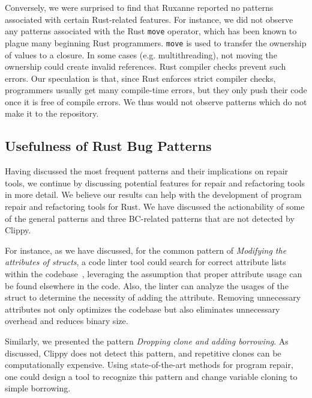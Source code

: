 Conversely, we were surprised to find that Ruxanne reported no patterns associated with certain Rust-related features. For instance, we did not observe any patterns associated with the Rust \verb+move+ operator, which has been known to plague many beginning Rust programmers. \verb+move+ is used to transfer the ownership of values to a closure. In some cases (e.g. multithreading), not moving the ownership could create invalid references. Rust compiler checks prevent such errors. Our speculation is that, since Rust enforces strict compiler checks, programmers usually get many compile-time errors, but they only push their code once it is free of compile errors. We thus would not observe patterns which do not make it to the repository.

\vspace*{1em}

\subsection{Usefulness of Rust Bug Patterns}

Having discussed the most frequent patterns and their implications on repair tools, we continue by discussing potential features for repair and refactoring tools in more detail. We believe our results can help with the development of program repair and refactoring tools for Rust. We have discussed the actionability of some of the general patterns and three BC-related patterns that are not detected by Clippy.

For instance, as we have discussed, for the common pattern of \textit{Modifying the attributes of structs}, a code linter tool could search for correct attribute lists within the codebase~\citep{forrest2009genetic}, leveraging the assumption that proper attribute usage can be found elsewhere in the code. Also, the linter can analyze the usages of the struct to determine the necessity of adding the attribute. Removing unnecessary attributes not only optimizes the codebase but also eliminates unnecessary overhead and reduces binary size.

Similarly, we presented the pattern \textit{Dropping clone and adding borrowing}. As discussed, Clippy does not detect this pattern, and repetitive clones can be computationally expensive. Using state-of-the-art methods for program repair, one could design a tool to recognize this pattern and change variable cloning to simple borrowing.

